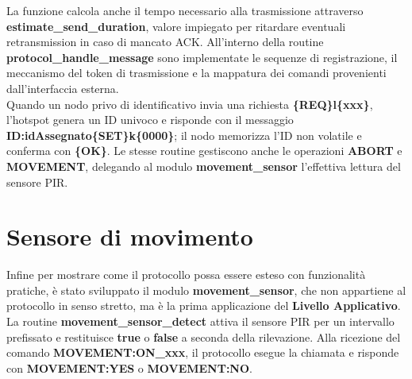 La funzione calcola anche il tempo necessario alla trasmissione attraverso \textbf{estimate\_send\_duration},
 valore impiegato per ritardare eventuali retransmission in caso di mancato ACK. All’interno della routine \textbf{protocol\_handle\_message} 
 sono implementate le sequenze di registrazione, il meccanismo del token di trasmissione e la mappatura dei comandi provenienti dall’interfaccia esterna.\\
  Quando un nodo privo di identificativo invia una richiesta \textbf{\{REQ\}l\{xxx\}}, l’hotspot genera un ID univoco e risponde con il messaggio 
  \textbf{ID:idAssegnato\{SET\}k\{0000\}}; il nodo memorizza l’ID non volatile e conferma con \textbf{\{OK\}}. Le stesse routine gestiscono anche 
  le operazioni \textbf{ABORT} e \textbf{MOVEMENT}, delegando al modulo \textbf{movement\_sensor} l’effettiva lettura del sensore PIR.

  \section{Sensore di movimento}

  Infine per mostrare come il protocollo possa essere esteso con funzionalità pratiche, è stato sviluppato il modulo \textbf{movement\_sensor}, che non appartiene al
  protocollo in senso stretto, ma è la prima applicazione del \textbf{Livello Applicativo}. 
  La routine \textbf{movement\_sensor\_detect} attiva il sensore PIR per un intervallo prefissato e restituisce \textbf{true} o \textbf{false} 
  a seconda della rilevazione. Alla ricezione del comando \textbf{MOVEMENT:ON\_xxx}, il protocollo esegue la chiamata e risponde con \textbf{MOVEMENT:YES} 
  o \textbf{MOVEMENT:NO}.